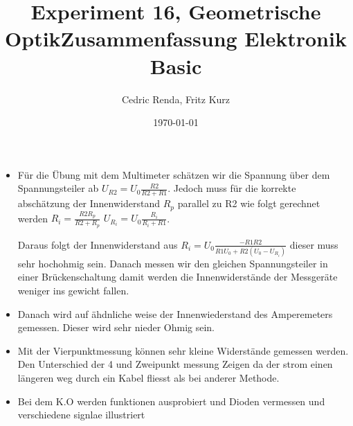 \documentclass[12pt,a4paper]{article}
\title{Experiment 16, Geometrische Optik}
\author{Cedric Renda, Fritz Kurz}
\date{\today }
\begin{document}
\title{Zusammenfassung Elektronik Basic}

\maketitle
\begin{itemize}
	\item Für die Übung mit dem Multimeter schätzen wir die Spannung über dem Spannungsteiler ab 
	$U_{R2}= U_0 \frac{R2}{R2+R1}$.
	Jedoch muss für die korrekte abschätzung der Innenwiderstand $R_{p}$ parallel zu R2 wie folgt gerechnet werden
	$R_i = \frac{R2R_p}{R2 + R_p}$
	$U_{R_i}= U_0 \frac{R_i}{R_i+R1}$.
	
	Daraus folgt der Innenwiderstand aus $\displaystyle R_i = U_0 \frac{-R1R2}{R1U_0+ R2(U_0-U_{R_i})}$ dieser muss sehr hochohmig sein. Danach messen wir den gleichen Spannungsteiler in einer Brückenschaltung damit werden die Innenwiderstände der Messgeräte weniger ins gewicht fallen.
	
\item	Danach wird auf ähdnliche weise der Innenwiederstand des Amperemeters gemessen. Dieser wird sehr nieder Ohmig sein. 
	
	
	
\item	Mit der Vierpunktmessung können sehr kleine Widerstände gemessen werden.
	Den Unterschied der 4 und Zweipunkt messung Zeigen da der strom einen längeren weg durch ein Kabel fliesst als bei anderer Methode.
	
	\item	Bei dem K.O werden funktionen ausprobiert und Dioden vermessen und verschiedene signlae illustriert
	
	
\end{itemize}
\end{document}
